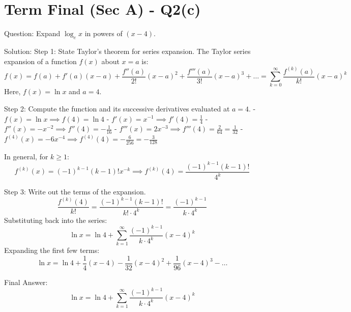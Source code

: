 \documentclass{article}
\begin{document}
\section*{Term Final (Sec A) - Q2(c)}
Question:
Expand $\log_e x$ in powers of $(x-4)$.

Solution:
Step 1: State Taylor's theorem for series expansion.
The Taylor series expansion of a function $f(x)$ about $x = a$ is:
\[
f(x) = f(a) + f'(a)(x-a) + \frac{f''(a)}{2!}(x-a)^2 + \frac{f'''(a)}{3!}(x-a)^3 + \dots = \sum_{k=0}^\infty \frac{f^{(k)}(a)}{k!}(x-a)^k
\]
Here, $f(x) = \ln x$ and $a = 4$.

Step 2: Compute the function and its successive derivatives evaluated at $a = 4$.
- $f(x) = \ln x \implies f(4) = \ln 4$
- $f'(x) = x^{-1} \implies f'(4) = \frac{1}{4}$
- $f''(x) = -x^{-2} \implies f''(4) = -\frac{1}{16}$
- $f'''(x) = 2x^{-3} \implies f'''(4) = \frac{2}{64} = \frac{1}{32}$
- $f^{(4)}(x) = -6x^{-4} \implies f^{(4)}(4) = -\frac{6}{256} = -\frac{3}{128}$

In general, for $k \ge 1$:
\[
f^{(k)}(x) = (-1)^{k-1} (k-1)! x^{-k} \implies f^{(k)}(4) = \frac{(-1)^{k-1} (k-1)!}{4^k}
\]

Step 3: Write out the terms of the expansion.
\[
\frac{f^{(k)}(4)}{k!} = \frac{(-1)^{k-1} (k-1)!}{k! \cdot 4^k} = \frac{(-1)^{k-1}}{k \cdot 4^k}
\]
Substituting back into the series:
\[
\ln x = \ln 4 + \sum_{k=1}^\infty \frac{(-1)^{k-1}}{k \cdot 4^k} (x-4)^k
\]
Expanding the first few terms:
\[
\ln x = \ln 4 + \frac{1}{4}(x-4) - \frac{1}{32}(x-4)^2 + \frac{1}{96}(x-4)^3 - \dots
\]

Final Answer:
\[
\boxed{\ln x = \ln 4 + \sum_{k=1}^\infty \frac{(-1)^{k-1}}{k \cdot 4^k} (x-4)^k}
\]

\end{document}
